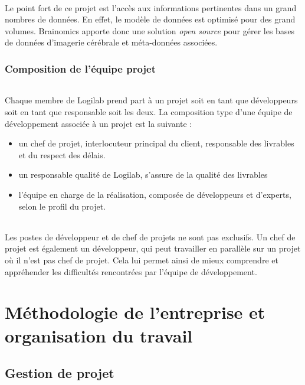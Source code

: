 \documentclass {report}
\begin{document}
\paragraph{}
Le point fort de ce projet est l'accès aux informations pertinentes dans un grand nombres de données. En effet, le modèle de données est optimisé pour des grand volumes. Brainomics apporte donc une solution \textit{open source} pour gérer les bases de données d'imagerie cérébrale et méta-données associées. 



\section{Composition de l'équipe projet}
\paragraph{}
Chaque membre de Logilab prend part à un projet soit en tant que développeurs soit en tant que responsable soit les deux. La composition type d'une équipe de développement associée à un projet est la suivante : 
\begin{itemize}
\item un chef de projet, interlocuteur principal du client, responsable des livrables et du respect des délais.
\item un responsable qualité de Logilab, s’assure de la qualité des livrables
\item l’équipe en charge de la réalisation, composée de développeurs et d’experts, selon le profil du projet.
\end{itemize}

\paragraph{}
Les postes de développeur et de chef de projets ne sont pas exclusifs. Un chef de projet est également un développeur, qui peut travailler en parallèle sur un projet où il n’est pas chef de projet. Cela lui permet ainsi de mieux comprendre et appréhender les difficultés rencontrées par l'équipe de développement.





\part{Méthodologie de l'entreprise et organisation du travail}
\chapter{Gestion de projet}
\end{document}

